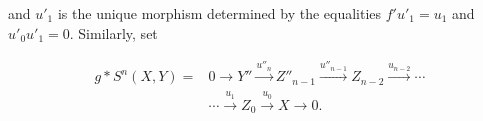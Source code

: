 \begin{center}
\end{center}
and $u'_1$ is the unique morphism determined by the equalities
$f'u'_1=u_1$ and $u'_0u'_1=0$. Similarly, set

\begin{equation}
\begin{aligned}
g*S^n(X,Y)={}&0\longrightarrow Y''\xrightarrow{u''_n}Z''_{n-1}
\xrightarrow{u''_{n-1}}Z_{n-2}\xrightarrow{u_{n-2}}\cdots\\
&\cdots\xrightarrow{u_1}Z_0\xrightarrow{u_0}X\longrightarrow0.
\end{aligned}
\tag{3.2.8.2}
\end{equation}
\endgroup
